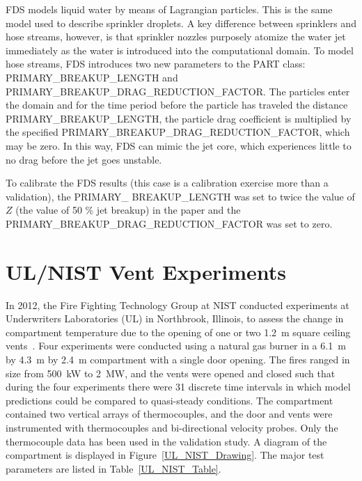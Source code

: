FDS models liquid water by means of Lagrangian particles.  This is the same model used to describe sprinkler droplets.  A key difference between sprinklers and hose streams, however, is that sprinkler nozzles purposely atomize the water jet immediately as the water is introduced into the computational domain.  To model hose streams, FDS introduces two new parameters to the {\ct PART} class: {\ct PRIMARY\_BREAKUP\_LENGTH} and {\ct PRIMARY\_BREAKUP\_DRAG\_REDUCTION\_FACTOR}.  The particles enter the domain and for the time period before the particle has traveled the distance {\ct PRIMARY\_BREAKUP\_LENGTH}, the particle drag coefficient is multiplied by the specified {\ct PRIMARY\_BREAKUP\_DRAG\_REDUCTION\_FACTOR}, which may be zero.  In this way, FDS can mimic the jet core, which experiences little to no drag before the jet goes unstable.

To calibrate the FDS results (this case is a calibration exercise more than a validation), the {\ct PRIMARY\_} {\ct BREAKUP\_LENGTH} was set to twice the value of $Z$ (the value of 50 \% jet breakup) in the paper and the {\ct PRIMARY\_BREAKUP\_DRAG\_REDUCTION\_FACTOR} was set to zero.


\section{UL/NIST Vent Experiments}
\label{UL_NIST_Vents_Description}

In 2012, the Fire Fighting Technology Group at NIST conducted experiments at Underwriters Laboratories (UL) in Northbrook, Illinois, to assess the change in compartment temperature due to the opening of one or two 1.2~m square ceiling vents~\cite{Opert:Masters}. Four experiments were conducted using a natural gas burner in a 6.1~m by 4.3~m by 2.4~m compartment with a single door opening. The fires ranged in size from 500~kW to 2~MW, and the vents were opened and closed such that during the four experiments there were 31 discrete time intervals in which model predictions could be compared to quasi-steady conditions. The compartment contained two vertical arrays of thermocouples, and the door and vents were instrumented with thermocouples and bi-directional velocity probes. Only the thermocouple data has been used in the validation study. A diagram of the compartment is displayed in Figure~\ref{UL_NIST_Drawing}. The major test parameters are listed in Table~\ref{UL_NIST_Table}.

